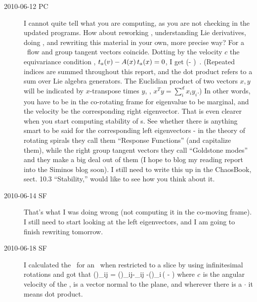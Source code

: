 \begin{description}
\item[2010-06-12 PC]
I cannot quite tell what you are computing, as you are not
checking in the updated programs.
How about reworking ,
understanding Lie derivatives,
doing ,
and rewriting this material in your own, more precise way?
For a \reqv\ flow and group tangent vectors coincide.
Dotting by the velocity $c$
the
equivariance condition ,
$
t_a(v)  - A(x) \, t_a(x) =0
$,
I get
\beq
(\velRel \cdot \Lg - \Mvar ) 
\,.
(Repeated indices are summed throughout this
report, and the dot product refers to a sum over
Lie algebra generators. The Euclidian product of two vectors
$x,y$ will be indicated by $x$-transpose times $y$, \ie,
$x^T y = \sum_i^d x_i y_i$.)
In other words, you have to be in the co-rotating
frame for eigenvalue to be marginal, and the velocity
be the corresponding right eigenvector. That is even
clearer when you start computing stability of \rpo s.
See whether there is anything smart to be said for the
corresponding left eigenvectors - in the theory of
rotating spirals they call them
``Response Functions'' (and capitalize them), while the
right group tangent vectors they call ``Goldstone
modes'' and they make a big deal out of them
(I hope to blog my reading report into
the Siminos blog soon). I still need to write this
up in the ChaosBook, sect. 10.3 ``Stability,'' would like
to see how you think about it.

\item[2010-06-14 SF]
That's what I was doing wrong (not computing it in the co-moving frame). I still need to start looking at the left eigenvectors, and I am going to finish rewriting  tomorrow.

\item[2010-06-18 SF]
I calculated the \stabmat\ for an \reqv\ when restricted to a slice by using infinitesimal rotations and got that
\beq
{\MvarRed}(\sspRed)_{ij} = \Mvar(\sspRed)_{ij}-\velRel \cdot \Lg_{ij}
     -\groupTan(\sspRed)_i\,\left(
     - \velRel {}
              \right)
where $c$ is the angular velocity of the \reqv, \sliceTan{} is a vector normal to the plane, and wherever there is a $\cdot$ it means dot product.


\end{description}
